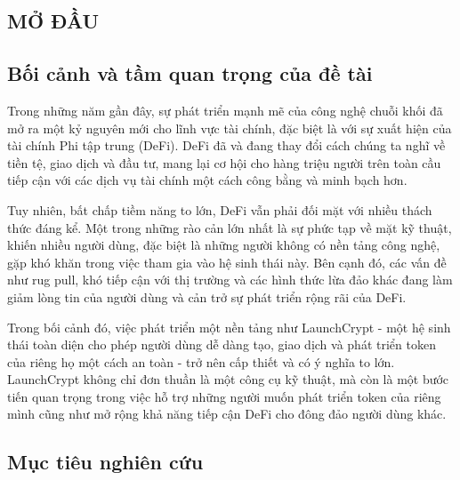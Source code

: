 \setcounter{page}{1}


\setlength{\parindent}{1cm}

\begin{center}
  \section*{MỞ ĐẦU}
\end{center}

\subsection*{Bối cảnh và tầm quan trọng của đề tài}

\hspace{\parindent}Trong những năm gần đây, sự phát triển mạnh mẽ của công nghệ
chuỗi khối đã mở ra một kỷ nguyên mới cho lĩnh vực tài chính, đặc biệt là với
sự xuất hiện của tài chính Phi tập trung (DeFi). DeFi đã và đang thay đổi cách
chúng ta nghĩ về tiền tệ, giao dịch và đầu tư, mang lại cơ hội cho hàng triệu
người trên toàn cầu tiếp cận với các dịch vụ tài chính một cách công bằng và
minh bạch hơn.

Tuy nhiên, bất chấp tiềm năng to lớn, DeFi vẫn phải đối mặt với nhiều thách
thức đáng kể. Một trong những rào cản lớn nhất là sự phức tạp về mặt kỹ thuật,
khiến nhiều người dùng, đặc biệt là những người không có nền tảng công nghệ,
gặp khó khăn trong việc tham gia vào hệ sinh thái này. Bên cạnh đó, các vấn đề
như rug pull, khó tiếp cận với thị trường và các hình thức lừa đảo khác đang
làm giảm lòng tin của người dùng và cản trở sự phát triển rộng rãi của DeFi.

Trong bối cảnh đó, việc phát triển một nền tảng như LaunchCrypt - một hệ sinh
thái toàn diện cho phép người dùng dễ dàng tạo, giao dịch và phát triển token
của riêng họ một cách an toàn - trở nên cấp thiết và có ý nghĩa to lớn.
LaunchCrypt không chỉ đơn thuần là một công cụ kỹ thuật, mà còn là một bước
tiến quan trọng trong việc hỗ trợ những người muốn phát triển token của riêng
mình cũng như mở rộng khả năng tiếp cận DeFi cho đông đảo người dùng khác.

\subsection*{Mục tiêu nghiên cứu}


